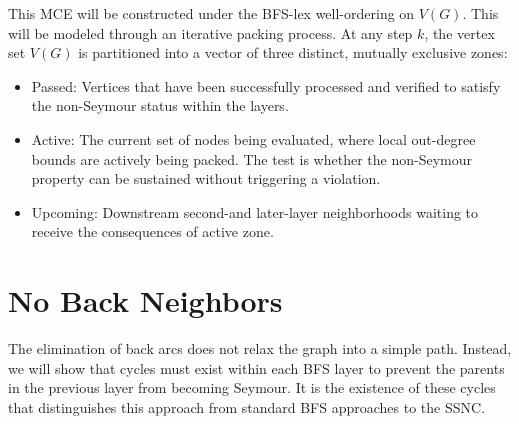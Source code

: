 \documentclass[AMS, Times1COL]{article} %
\theoremstyle{definition}
\begin{document}
	
	This MCE will be constructed under the BFS-lex well-ordering on $V(G)$. This will be modeled through an iterative packing process. At any step $k$, the vertex set $V(G)$ is partitioned into a vector of three distinct, mutually exclusive zones:
	
	\begin{itemize}
		\item Passed: Vertices that have been successfully processed and verified to satisfy the non-Seymour status within the layers. 
		
		\item Active: The current set of nodes being evaluated, where local out-degree bounds are actively being packed. The test is whether the non-Seymour property can be sustained without triggering a violation. 
		
		\item Upcoming: Downstream second-and later-layer neighborhoods waiting to receive the consequences of active zone. 
	\end{itemize}
	
	
	\section{No Back Neighbors}
	
	The elimination of back arcs does not relax the graph into a simple path. 
	Instead, we will show that cycles must exist within each BFS layer to prevent the parents in the previous layer from becoming Seymour. 
	It is the existence of these cycles that distinguishes this approach from standard BFS approaches to the SSNC. 
	
\end{document}
